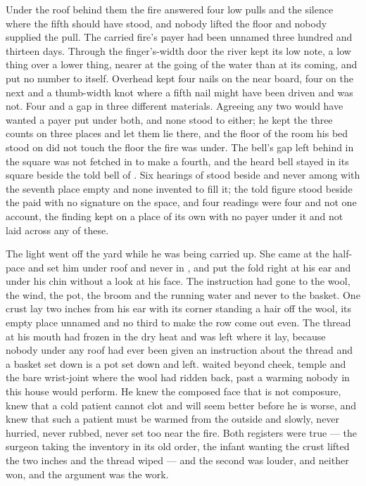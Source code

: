 Under the roof behind them the fire answered four low pulls and the silence where the fifth should have stood, and nobody lifted the floor and nobody supplied the pull. The carried fire's payer had been unnamed three hundred and thirteen days. Through the finger's-width door the river kept its low note, a low thing over a lower thing, nearer at the going of the water than at its coming, and put no number to itself. Overhead  kept four nails on the near board, four on the next and a thumb-width knot where a fifth nail might have been driven and was not. Four and a gap in three different materials. Agreeing any two would have wanted a payer put under both, and none stood to either; he kept the three counts on three places and let them lie there, and the floor of the room his bed stood on did not touch the floor the fire was under. The bell's gap left behind in the square was not fetched in to make a fourth, and the heard bell stayed in its square beside the told bell of . Six hearings of  stood beside and never among with the seventh place empty and none invented to fill it; the told figure stood beside the paid with no signature on the space, and four readings were four and not one account, the finding kept on a place of its own with no payer under it and not laid across any of these.

\scenebreak

The light went off the yard while he was being carried up. She came at the half-pace and set him under  roof and never in , and put the fold right at his ear and under his chin without a look at his face. The instruction had gone to the wool, the wind, the pot, the broom and the running water and never to the basket. One crust lay two inches from his ear with its corner standing a hair off the wool, its empty place unnamed and no third to make the row come out even. The thread at his mouth had frozen in the dry heat and was left where it lay, because nobody under any roof had ever been given an instruction about the thread and a basket set down is a pot set down and left.  waited beyond cheek, temple and the bare wrist-joint where the wool had ridden back, past a warming nobody in this house would perform. He knew the composed face that is not composure, knew that a cold patient cannot clot and will seem better before he is worse, and knew that such a patient must be warmed from the outside and slowly, never hurried, never rubbed, never set too near the fire. Both registers were true --- the surgeon taking the inventory in its old order, the infant wanting the crust lifted the two inches and the thread wiped --- and the second was louder, and neither won, and the argument was the work.

